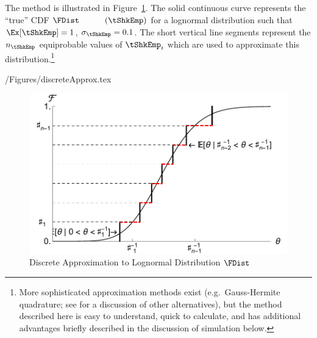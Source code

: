 \documentclass[titlepage]{\econtex}
\begin{document}
The method is illustrated in Figure~\ref{fig:discreteapprox}.  The solid continuous curve represents
the ``true'' CDF $\FDist_{\phantom{\tShkEmp}}(\tShkEmp)$ for a lognormal distribution such that $\Ex[\tShkEmp] = 1$, $\sigma_{\tShkEmp} = 0.1$.  The short vertical line segments represent the $n_{\tShkEmp}$
equiprobable values of $\tShkEmp_{i}$ which are used to approximate this
distribution.\footnote{More sophisticated approximation methods exist
  (e.g.\ Gauss-Hermite quadrature; see \cite{kopecky2010finite} for a discussion of other alternatives), but the method described here is easy to understand, quick to calculate, and has additional advantages briefly described in the
  discussion of simulation below.}
\begin{verbatimwrite}{\econtexRoot/Figures/discreteApprox.tex}
  \hypertarget{discreteApprox}{}
  \begin{figure}
    \includegraphics{./Figures/discreteApprox}
    \caption{Discrete Approximation to Lognormal Distribution $\FDist$}
    \label{fig:discreteapprox}
  \end{figure}
\end{verbatimwrite}

\end{document}
